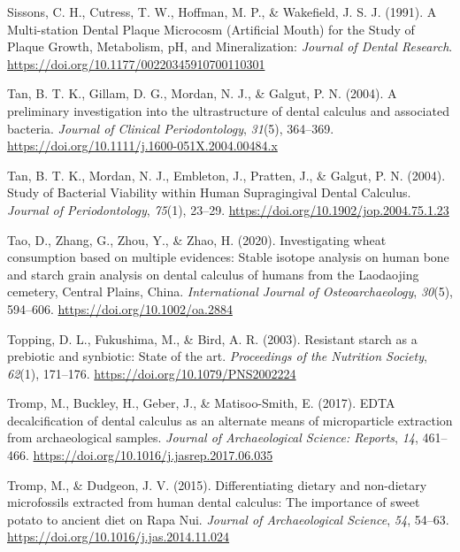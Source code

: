 \documentclass[
  b5paper,
]{book}
\newlength{\cslhangindent}
\newlength{\cslentryspacingunit} %
\newenvironment{CSLReferences}[2] %
 {%
  \setlength{\parindent}{0pt}
  \ifodd #1
  \let\oldpar\par
  \def\par{\hangindent=\cslhangindent\oldpar}
  \fi
  \setlength{\parskip}{#2\cslentryspacingunit}
 }%
 {}
\begin{document}
\begin{CSLReferences}{1}{0}
\leavevmode{}%
Sissons, C. H., Cutress, T. W., Hoffman, M. P., \& Wakefield, J. S. J.
(1991). A {Multi-station Dental Plaque Microcosm} ({Artificial Mouth})
for the {Study} of {Plaque Growth}, {Metabolism}, {pH}, and
{Mineralization}: \emph{Journal of Dental Research}.
\url{https://doi.org/10.1177/00220345910700110301}

\leavevmode{}%
Tan, B. T. K., Gillam, D. G., Mordan, N. J., \& Galgut, P. N. (2004). A
preliminary investigation into the ultrastructure of dental calculus and
associated bacteria. \emph{Journal of Clinical Periodontology},
\emph{31}(5), 364--369.
\url{https://doi.org/10.1111/j.1600-051X.2004.00484.x}

\leavevmode{}%
Tan, B. T. K., Mordan, N. J., Embleton, J., Pratten, J., \& Galgut, P.
N. (2004). Study of {Bacterial Viability} within {Human Supragingival
Dental Calculus}. \emph{Journal of Periodontology}, \emph{75}(1),
23--29. \url{https://doi.org/10.1902/jop.2004.75.1.23}

\leavevmode{}%
Tao, D., Zhang, G., Zhou, Y., \& Zhao, H. (2020). Investigating wheat
consumption based on multiple evidences: {Stable} isotope analysis on
human bone and starch grain analysis on dental calculus of humans from
the {Laodaojing} cemetery, {Central Plains}, {China}.
\emph{International Journal of Osteoarchaeology}, \emph{30}(5),
594--606. \url{https://doi.org/10.1002/oa.2884}

\leavevmode{}%
Topping, D. L., Fukushima, M., \& Bird, A. R. (2003). Resistant starch
as a prebiotic and synbiotic: State of the art. \emph{Proceedings of the
Nutrition Society}, \emph{62}(1), 171--176.
\url{https://doi.org/10.1079/PNS2002224}

\leavevmode{}%
Tromp, M., Buckley, H., Geber, J., \& Matisoo-Smith, E. (2017). {EDTA}
decalcification of dental calculus as an alternate means of
microparticle extraction from archaeological samples. \emph{Journal of
Archaeological Science: Reports}, \emph{14}, 461--466.
\url{https://doi.org/10.1016/j.jasrep.2017.06.035}

\leavevmode{}%
Tromp, M., \& Dudgeon, J. V. (2015). Differentiating dietary and
non-dietary microfossils extracted from human dental calculus: The
importance of sweet potato to ancient diet on {Rapa Nui}. \emph{Journal
of Archaeological Science}, \emph{54}, 54--63.
\url{https://doi.org/10.1016/j.jas.2014.11.024}


\end{CSLReferences}
\end{document}
